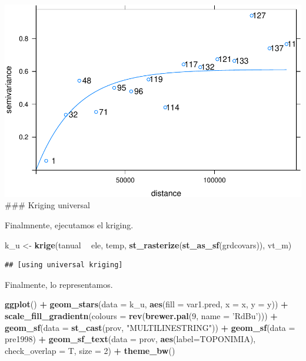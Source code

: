 \documentclass[11pt,]{article}
\newenvironment{Shaded}{\begin{snugshade}}{\end{snugshade}}
\newcommand{\KeywordTok}[1]{\textcolor[rgb]{0.13,0.29,0.53}{\textbf{#1}}}
\newcommand{\DataTypeTok}[1]{\textcolor[rgb]{0.13,0.29,0.53}{#1}}
\newcommand{\DecValTok}[1]{\textcolor[rgb]{0.00,0.00,0.81}{#1}}
\newcommand{\StringTok}[1]{\textcolor[rgb]{0.31,0.60,0.02}{#1}}
\newcommand{\OperatorTok}[1]{\textcolor[rgb]{0.81,0.36,0.00}{\textbf{#1}}}
\newcommand{\NormalTok}[1]{#1}
\begin{document}
\includegraphics[width=800px]{proyecto_files/figure-latex/vgm-temp-ajus-1}
\#\#\# Kriging universal

Finalmnente, ejecutamos el kriging.

\begin{Shaded}
\begin{Highlighting}[]
\NormalTok{k_u <-}\StringTok{ }\KeywordTok{krige}\NormalTok{(tanual }\OperatorTok{~}\StringTok{ }\NormalTok{ele, temp, }\KeywordTok{st_rasterize}\NormalTok{(}\KeywordTok{st_as_sf}\NormalTok{(grdcovars)), vt_m)}
\end{Highlighting}
\end{Shaded}

\begin{verbatim}
## [using universal kriging]
\end{verbatim}

Finalmente, lo representamos.

\begin{Shaded}
\begin{Highlighting}[]
\KeywordTok{ggplot}\NormalTok{() }\OperatorTok{+}
\StringTok{  }\KeywordTok{geom_stars}\NormalTok{(}\DataTypeTok{data =}\NormalTok{ k_u, }\KeywordTok{aes}\NormalTok{(}\DataTypeTok{fill =}\NormalTok{ var1.pred, }\DataTypeTok{x =}\NormalTok{ x, }\DataTypeTok{y =}\NormalTok{ y)) }\OperatorTok{+}\StringTok{ }
\StringTok{  }\KeywordTok{scale_fill_gradientn}\NormalTok{(}\DataTypeTok{colours =} \KeywordTok{rev}\NormalTok{(}\KeywordTok{brewer.pal}\NormalTok{(}\DecValTok{9}\NormalTok{, }\DataTypeTok{name =} \StringTok{'RdBu'}\NormalTok{))) }\OperatorTok{+}
\StringTok{  }\KeywordTok{geom_sf}\NormalTok{(}\DataTypeTok{data =} \KeywordTok{st_cast}\NormalTok{(prov, }\StringTok{"MULTILINESTRING"}\NormalTok{)) }\OperatorTok{+}
\StringTok{  }\KeywordTok{geom_sf}\NormalTok{(}\DataTypeTok{data =}\NormalTok{ pre1998) }\OperatorTok{+}
\StringTok{  }\KeywordTok{geom_sf_text}\NormalTok{(}\DataTypeTok{data =}\NormalTok{ prov, }\KeywordTok{aes}\NormalTok{(}\DataTypeTok{label=}\NormalTok{TOPONIMIA), }\DataTypeTok{check_overlap =}\NormalTok{ T, }\DataTypeTok{size =} \DecValTok{2}\NormalTok{) }\OperatorTok{+}
\StringTok{  }\KeywordTok{theme_bw}\NormalTok{()}
\end{Highlighting}
\end{Shaded}
\end{document}
